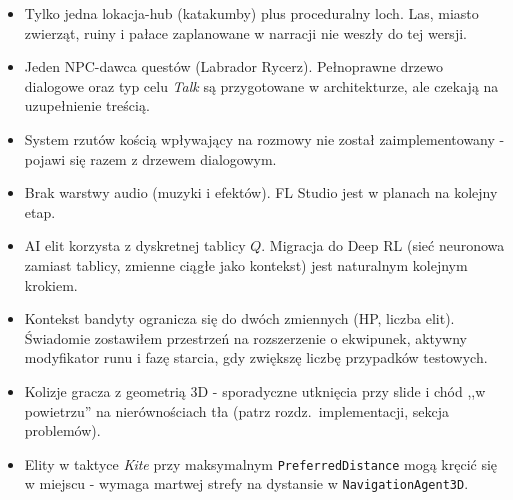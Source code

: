 \begin{itemize}
    \item Tylko jedna lokacja-hub (katakumby) plus proceduralny loch. Las, miasto zwierząt, ruiny i pałace zaplanowane w narracji nie weszły do tej wersji.
    \item Jeden NPC-dawca questów (Labrador Rycerz). Pełnoprawne drzewo dialogowe oraz typ celu \textit{Talk} są przygotowane w architekturze, ale czekają na uzupełnienie treścią.
    \item System rzutów kością wpływający na rozmowy nie został zaimplementowany - pojawi się razem z drzewem dialogowym.
    \item Brak warstwy audio (muzyki i efektów). FL Studio jest w planach na kolejny etap.
    \item AI elit korzysta z dyskretnej tablicy $Q$. Migracja do Deep RL (sieć neuronowa zamiast tablicy, zmienne ciągłe jako kontekst) jest naturalnym kolejnym krokiem.
    \item Kontekst bandyty ogranicza się do dwóch zmiennych (HP, liczba elit). Świadomie zostawiłem przestrzeń na rozszerzenie o ekwipunek, aktywny modyfikator runu i fazę starcia, gdy zwiększę liczbę przypadków testowych.
    \item Kolizje gracza z geometrią 3D - sporadyczne utknięcia przy slide i chód ,,w powietrzu'' na nierównościach tła (patrz rozdz.~implementacji, sekcja problemów).
    \item Elity w taktyce \textit{Kite} przy maksymalnym \texttt{PreferredDistance} mogą kręcić się w miejscu - wymaga martwej strefy na dystansie w \texttt{NavigationAgent3D}.
\end{itemize}
